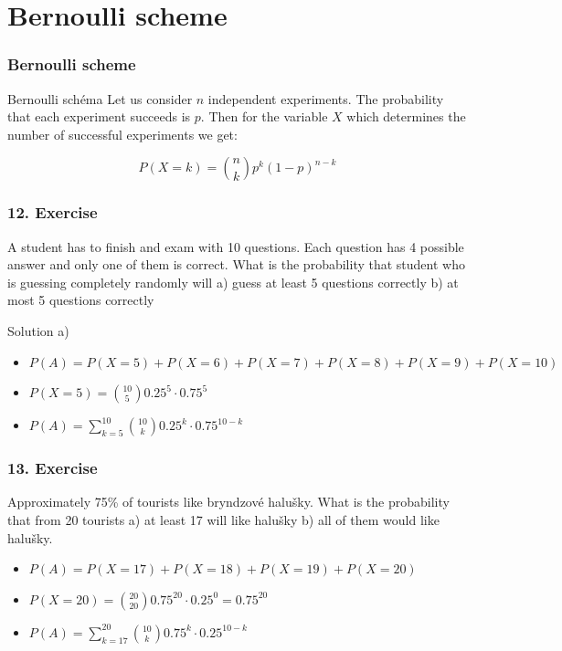 \documentclass{beamer}
\begin{document}
\section{Bernoulli scheme}
\begin{frame}
\frametitle{Bernoulli scheme}

\begin{block}{Bernoulli schéma}
Let us consider $n$ independent experiments. The probability that each experiment succeeds is $p$. Then for the variable $X$ which determines the number of successful experiments we get:

\begin{equation}
P(X = k) = \binom{n}{k} p^k (1 - p)^{n-k} 
\end{equation}
\end{block}
\end{frame}

\begin{frame}
\frametitle{12. Exercise}

A student has to finish and exam with 10 questions. Each question has 4 possible answer and only one of them is correct. What is the probability that student who is guessing completely randomly will a) guess at least 5 questions correctly b) at most 5 questions correctly

Solution a)
\begin{itemize}
\item<2-> $P(A) = P(X = 5) + P(X = 6) + P(X = 7) + P(X = 8) + P(X = 9) + P(X = 10)$
\item<3-> $P(X = 5) = \binom{10}{5} 0.25^5 \cdot 0.75^5$
\item<4-> $P(A) = \sum_{k=5}^{10} \binom{10}{k} 0.25^k \cdot 0.75^{10-k}$
\end{itemize}

\end{frame}

\begin{frame}
\frametitle{13. Exercise}

Approximately 75\% of tourists like bryndzové halušky. What is the probability that from 20 tourists a) at least 17 will like halušky b) all of them would like halušky.

\begin{itemize}
\item<2-> $P(A) = P(X = 17) + P(X = 18) + P(X = 19) + P(X = 20)$
\item<3-> $P(X = 20) = \binom{20}{20} 0.75^{20} \cdot 0.25^0 = 0.75^{20}$
\item<4-> $P(A) = \sum_{k=17}^{20} \binom{10}{k} 0.75^k \cdot 0.25^{10-k}$
\end{itemize}
\end{frame}
\end{document}
